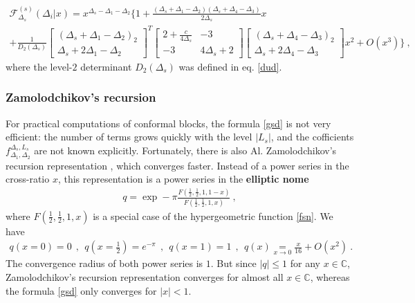 \documentclass[12pt, a4paper, notitlepage, twoside]{report}
\numberwithin{equation}{section}
\theoremstyle{break}
\begin{document}
\begin{multline}
 \mathcal{F}^{(s)}_{\Delta_s}(\Delta_i|x) 
= x^{\Delta_s - \Delta_1 - \Delta_2}\Bigg\{ 1 
+ \frac{(\Delta_s+\Delta_1-\Delta_2)(\Delta_s+\Delta_4-\Delta_3)}{2\Delta_s} x  
\\
+ \frac{1}{D_2(\Delta_s)}
\begin{bmatrix} (\Delta_s+\Delta_1-\Delta_2)_2 \\ \Delta_s+2\Delta_1-\Delta_2 \end{bmatrix}^T
\begin{bmatrix} 2+\frac{c}{4\Delta_s} & -3 \\ -3 & 4\Delta_s+2 \end{bmatrix}
\begin{bmatrix} (\Delta_s+\Delta_4-\Delta_3)_2 \\ \Delta_s+2\Delta_4-\Delta_3 \end{bmatrix}
 x^2 + O(x^3)\Bigg\}\ ,
 \label{eq:fsexp}
\end{multline}
where the level-$2$ determinant $D_2(\Delta_s)$ was defined in eq. \eqref{dud}.


\subsubsection{Zamolodchikov's recursion}

For practical computations of conformal blocks, the formula \eqref{gsd} is not very efficient: the number of terms grows quickly with the level $|L_s|$, and the cofficients $f_{\Delta_1,\Delta_2}^{\Delta_s,L_s}$ are not known explicitly.
Fortunately, there is also Al.
Zamolodchikov's recursion representation \cite{zz90}, which converges faster.
Instead of a power series in the cross-ratio $x$, this representation is a power series in the \textbf{elliptic nome}
\begin{align}
 q = \exp -\pi \frac{F(\frac12,\frac12,1,1-x)}{F(\frac12,\frac12,1,x)}  \ , 
\end{align}
where $F(\frac12,\frac12,1,x)$ is a special case of the hypergeometric function \eqref{fsn}. 
We have 
\begin{align}
 q(x=0)=0 \ \ , \ \ q(x=\tfrac12) = e^{-\pi} \ \ , \ \ q(x=1)=1 \ \ , \ \ q(x)\underset{x\to 0}{=} \frac{x}{16} +O(x^2)\ .
\end{align}
The convergence radius of both power series is $1$.
But since $|q|\leq 1$ for any $x\in\mathbb{C}$, Zamolodchikov's recursion representation converges for almost all $x\in \mathbb{C}$, whereas the formula \eqref{gsd} only converges for $|x|<1$.
\end{document}
